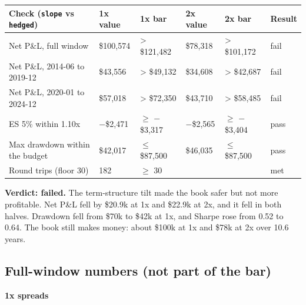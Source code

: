 \documentclass{article}
\begin{document}
\begin{center}\small
\begin{tabularx}{\linewidth}{>{\raggedright\arraybackslash}X l l l l l}
\toprule
\textbf{Check (\texttt{slope} vs \texttt{hedged})} & \textbf{1x value} & \textbf{1x bar} & \textbf{2x value} & \textbf{2x bar} & \textbf{Result} \\
\midrule
Net P\&L, full window & \$100,574 & > \$121,482 & \$78,318 & > \$101,172 & fail \\
Net P\&L, 2014-06 to 2019-12 & \$43,556 & > \$49,132 & \$34,608 & > \$42,687 & fail \\
Net P\&L, 2020-01 to 2024-12 & \$57,018 & > \$72,350 & \$43,710 & > \$58,485 & fail \\
ES 5\% within 1.10x & \ensuremath{-}\$2,471 & \ensuremath{\geq} \ensuremath{-}\$3,317 & \ensuremath{-}\$2,565 & \ensuremath{\geq} \ensuremath{-}\$3,404 & pass \\
Max drawdown within the budget & \$42,017 & \ensuremath{\leq} \$87,500 & \$46,035 & \ensuremath{\leq} \$87,500 & pass \\
Round trips (floor 30) & 182 & \ensuremath{\geq} 30 &  &  & met \\
\bottomrule
\end{tabularx}
\end{center}

\textbf{Verdict: failed.} The term-structure tilt made the book safer but not more profitable. Net P\&L fell by \$20.9k at 1x and \$22.9k at 2x, and it fell in both halves. Drawdown fell from \$70k to \$42k at 1x, and Sharpe rose from 0.52 to 0.64. The book still makes money: about \$100k at 1x and \$78k at 2x over 10.6 years.

\subsection{Full-window numbers (not part of the bar)}

\textbf{1x spreads}
\end{document}

